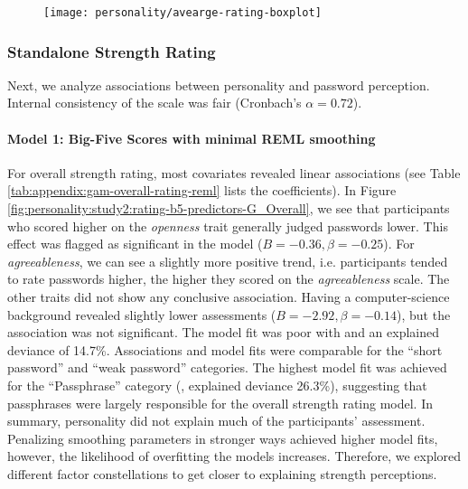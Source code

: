 \begin{figure}[htbp]
	\centering
	\texttt{[image: personality/avearge-rating-boxplot]}
	\caption{\label{fig:personality:study2:average-rating-boxplot}}
\end{figure}

%

\subsubsection{Standalone Strength Rating}
Next, we analyze associations between personality and password perception. Internal consistency of the scale was fair (Cronbach's $\alpha=0.72$). 

\paragraph{Model 1: Big-Five Scores with minimal REML smoothing}
For overall strength rating, most covariates revealed linear associations (see Table \ref{tab:appendix:gam-overall-rating-reml} lists the coefficients). In Figure \ref{fig:personality:study2:rating-b5-predictors-G_Overall}, we see that participants who scored higher on the \textit{openness} trait generally judged passwords lower. This effect was flagged as significant in the model ($B=-0.36, \beta=-0.25$). For \textit{agreeableness}, we can see a slightly more positive trend, i.e. participants tended to rate passwords higher, the higher they scored on the \textit{agreeableness} scale. The other traits did not show any conclusive association. Having a computer-science background revealed slightly lower assessments ($B=-2.92, \beta=-0.14$), but the association was not significant. The model fit was poor with  and an explained deviance of 14.7\%. Associations and model fits were comparable for the ``short password'' and ``weak password'' categories. The highest model fit was achieved for the ``Passphrase'' category (, explained deviance 26.3\%), suggesting that passphrases were largely responsible for the overall strength rating model. In summary, personality did not explain much of the participants' assessment. Penalizing smoothing parameters in stronger ways achieved higher model fits, however, the likelihood of overfitting the models increases. Therefore, we explored different factor constellations to get closer to explaining strength perceptions.

